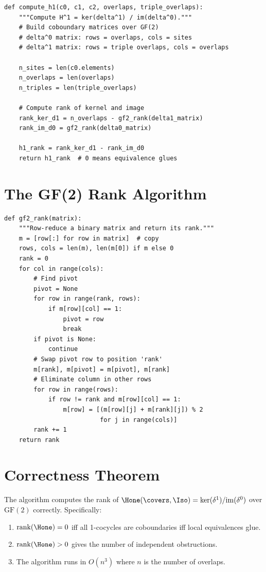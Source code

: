 \begin{lstlisting}[caption={$\Hone$ computation}]
def compute_h1(c0, c1, c2, overlaps, triple_overlaps):
    """Compute H^1 = ker(delta^1) / im(delta^0)."""
    # Build coboundary matrices over GF(2)
    # delta^0 matrix: rows = overlaps, cols = sites
    # delta^1 matrix: rows = triple overlaps, cols = overlaps

    n_sites = len(c0.elements)
    n_overlaps = len(overlaps)
    n_triples = len(triple_overlaps)

    # Compute rank of kernel and image
    rank_ker_d1 = n_overlaps - gf2_rank(delta1_matrix)
    rank_im_d0 = gf2_rank(delta0_matrix)

    h1_rank = rank_ker_d1 - rank_im_d0
    return h1_rank  # 0 means equivalence glues
\end{lstlisting}

\section{The GF(2) Rank Algorithm}

\begin{lstlisting}[caption={Gaussian elimination over GF(2)}]
def gf2_rank(matrix):
    """Row-reduce a binary matrix and return its rank."""
    m = [row[:] for row in matrix]  # copy
    rows, cols = len(m), len(m[0]) if m else 0
    rank = 0
    for col in range(cols):
        # Find pivot
        pivot = None
        for row in range(rank, rows):
            if m[row][col] == 1:
                pivot = row
                break
        if pivot is None:
            continue
        # Swap pivot row to position 'rank'
        m[rank], m[pivot] = m[pivot], m[rank]
        # Eliminate column in other rows
        for row in range(rows):
            if row != rank and m[row][col] == 1:
                m[row] = [(m[row][j] + m[rank][j]) % 2
                          for j in range(cols)]
        rank += 1
    return rank
\end{lstlisting}

\section{Correctness Theorem}

\begin{theorem}
The algorithm computes the rank of $\Hone(\covers, \Iso) =
\ker(\delta^1) / \mathrm{im}(\delta^0)$ over $\mathrm{GF}(2)$
correctly.  Specifically:
\begin{enumerate}
  \item $\mathrm{rank}(\Hone) = 0$ iff all 1-cocycles are
    coboundaries iff local equivalences glue.
  \item $\mathrm{rank}(\Hone) > 0$ gives the number of independent
    obstructions.
  \item The algorithm runs in $O(n^3)$ where $n$ is the number of
    overlaps.
\end{enumerate}
\end{theorem}

